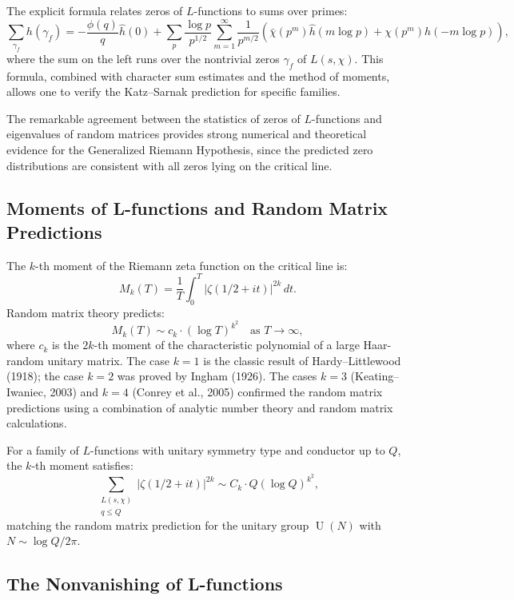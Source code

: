 The explicit formula relates zeros of $L$-functions to sums over primes:
\[
\sum_{\gamma_f} h(\gamma_f) = -\frac{\phi(q)}{q} \hat{h}(0) + \sum_p \frac{\log p}{p^{1/2}} \sum_{m=1}^{\infty} \frac{1}{p^{m/2}} \left( \bar{\chi}(p^m) \hat{h}(m \log p) + \chi(p^m) \hat{h}(-m \log p) \right),
\]
where the sum on the left runs over the nontrivial zeros $\gamma_f$ of $L(s, \chi)$. This formula, combined with character sum estimates and the method of moments, allows one to verify the Katz--Sarnak prediction for specific families.

\begin{remark}
The remarkable agreement between the statistics of zeros of $L$-functions and eigenvalues of random matrices provides strong numerical and theoretical evidence for the Generalized Riemann Hypothesis, since the predicted zero distributions are consistent with all zeros lying on the critical line.
\end{remark}

\subsection{Moments of L-functions and Random Matrix Predictions}

The $k$-th moment of the Riemann zeta function on the critical line is:
\[
M_k(T) = \frac{1}{T} \int_0^T |\zeta(1/2 + it)|^{2k} \, dt.
\]
Random matrix theory predicts:
\[
M_k(T) \sim c_k \cdot (\log T)^{k^2} \quad \text{as } T \to \infty,
\]
where $c_k$ is the $2k$-th moment of the characteristic polynomial of a large Haar-random unitary matrix. The case $k = 1$ is the classic result of Hardy--Littlewood (1918); the case $k = 2$ was proved by Ingham (1926). The cases $k = 3$ (Keating--Iwaniec, 2003) and $k = 4$ (Conrey et al., 2005) confirmed the random matrix predictions using a combination of analytic number theory and random matrix calculations.

\begin{theorem}
For a family of $L$-functions with unitary symmetry type and conductor up to $Q$, the $k$-th moment satisfies:
\[
\sum_{\substack{L(s, \chi) \\ q \leq Q}} |\zeta(1/2 + it)|^{2k} \sim C_k \cdot Q (\log Q)^{k^2},
\]
matching the random matrix prediction for the unitary group $\operatorname{U}(N)$ with $N \sim \log Q / 2\pi$.
\end{theorem}

\subsection{The Nonvanishing of L-functions}

